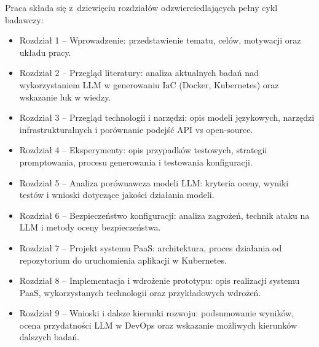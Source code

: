 Praca składa się z dziewięciu rozdziałów odzwierciedlających pełny cykl badawczy:
\begin{itemize}
  \item Rozdział 1 – Wprowadzenie: przedstawienie tematu, celów, motywacji oraz układu pracy.
  \item Rozdział 2 – Przegląd literatury: analiza aktualnych badań nad wykorzystaniem LLM w generowaniu IaC (Docker, Kubernetes) oraz wskazanie luk w wiedzy.
  \item Rozdział 3 – Przegląd technologii i narzędzi: opis modeli językowych, narzędzi infrastrukturalnych i porównanie podejść API vs open-source.
  \item Rozdział 4 – Eksperymenty: opis przypadków testowych, strategii promptowania, procesu generowania i testowania konfiguracji.
  \item Rozdział 5 – Analiza porównawcza modeli LLM: kryteria oceny, wyniki testów i wnioski dotyczące jakości działania modeli.
  \item Rozdział 6 – Bezpieczeństwo konfiguracji: analiza zagrożeń, technik ataku na LLM i metody oceny bezpieczeństwa.
  \item Rozdział 7 – Projekt systemu PaaS: architektura, proces działania od repozytorium do uruchomienia aplikacji w Kubernetes.
  \item Rozdział 8 – Implementacja i wdrożenie prototypu: opis realizacji systemu PaaS, wykorzystanych technologii oraz przykładowych wdrożeń.
  \item Rozdział 9 – Wnioski i dalsze kierunki rozwoju: podsumowanie wyników, ocena przydatności LLM w DevOps oraz wskazanie możliwych kierunków dalszych badań.
\end{itemize}

